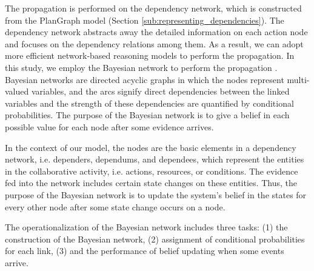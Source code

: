 The propagation is performed on the dependency network, which is constructed from the PlanGraph model (Section \ref{sub:representing_dependencies}). The dependency network abstracts away the detailed information on each action node and focuses on the dependency relations among them. As a result, we can adopt more efficient network-based reasoning models to perform the propagation. In this study, we employ the Bayesian network to perform the propagation \cite{pearl1988probabilistic}. Bayesian networks are directed acyclic graphs in which the nodes represent multi-valued variables, and the arcs signify direct dependencies between the linked variables and the strength of these dependencies are quantified by conditional probabilities. The purpose of the Bayesian network is to give a belief in each possible value for each node after some evidence arrives.

In the context of our model, the nodes are the basic elements in a dependency network, i.e. dependers, dependums, and dependees, which represent the entities in the collaborative activity, i.e.  actions, resources, or conditions. The evidence fed into the network includes certain state changes on these entities. Thus, the purpose of the Bayesian network is to update the system's belief in the states for every other node after some state change occurs on a node.

The operationalization of the Bayesian network includes three tasks: (1) the construction of the Bayesian network, (2) assignment of conditional probabilities for each link, (3) and the performance of belief updating when some events arrive.

